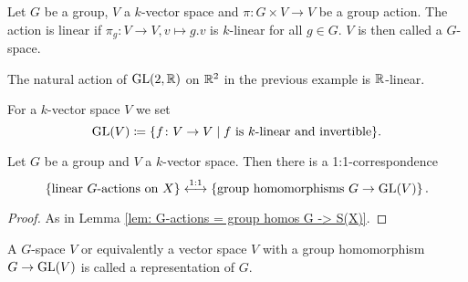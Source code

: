 \begin{defi}
  Let $G$ be a group, $V$ a $k$-vector space and $\pi \colon G \times V \to V$ be a group action. The action is linear if $\pi_g \colon V \to V, v \mapsto g.v$ is $k$-linear for all $g \in G$. $V$ is then called a $G$-space.
\end{defi}


\begin{expl}
  The natural action of $\operatorname{GL}(2,\mathbb{R})$ on $\mathbb{R}^2$ in the previous example is $\mathbb{R}$-linear.
\end{expl}


For a $k$-vector space $V$ we set
\[
  \operatorname{GL}(V) \coloneqq \{f \colon V \to V \mid f \text{ is $k$-linear and invertible}\}.
\]


\begin{lem}
  Let $G$ be a group and $V$ a $k$-vector space. Then there is a 1:1-correspondence
  \[
        \left\{\text{linear $G$-actions on $X$}\right\}
    \overset{1:1}{\longleftrightarrow}
    \left\{\text{group homomorphisms $G \to \operatorname{GL}(V)$}\right\}.
  \]
\end{lem}
\begin{proof}
  As in Lemma \ref{lem: G-actions = group homos G -> S(X)}.
\end{proof}


\begin{rem}
  A $G$-space $V$ or equivalently a vector space $V$ with a group homomorphism $G \to \operatorname{GL}(V)$ is called a representation of $G$.
\end{rem}


